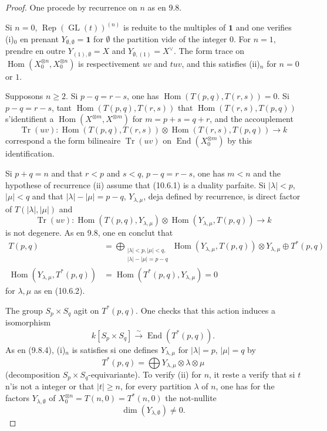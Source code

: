 \documentclass[11pt,a4paper]{article}
\theoremstyle{plain}
\theoremstyle{definition}
\DeclareMathOperator{\Hom}{Hom}
\DeclareMathOperator{\End}{End}
\DeclareMathOperator{\Tr}{Tr}
\DeclareMathOperator{\Rep}{Rep}
\DeclareMathOperator{\GL}{GL}
\newcommand{\isom}{\xrightarrow{\sim}}
\begin{document}
\begin{proof}
One procede by recurrence on $n$ as en 9.8.

Si $n = 0$, $\Rep(\GL(t))^{(n)}$ is reduite to the multiples of $\mathbf{1}$ and one verifies (i)$_0$ en prenant $Y_{\emptyset, \emptyset} = \mathbf{1}$ for $\emptyset$ the partition vide of the integer $0$. For $n = 1$, prendre en outre $Y_{(1), \emptyset} = X$ and $Y_{\emptyset, (1)} = X^\vee$. The form trace on $\Hom(X_0^{\otimes n}, X_0^{\otimes n})$ is respectivement $uv$ and $tuv$, and this satisfies (ii)$_n$ for $n = 0$ or $1$.

Supposons $n \geq 2$. Si $p - q = r - s$, one has $\Hom(T(p, q), T(r, s)) = 0$. Si $p - q = r - s$, tant $\Hom(T(p, q), T(r, s))$ that $\Hom(T(r, s), T(p, q))$ s'identifient a $\Hom(X^{\otimes m}, X^{\otimes m})$ for $m = p + s = q + r$, and the accouplement
\begin{equation}
\Tr(uv) : \Hom(T(p, q), T(r, s)) \otimes \Hom(T(r, s), T(p, q)) \to k \tag{10.6.1}
\end{equation}
correspond a the form bilineaire $\Tr(uv)$ on $\End(X_0^{\otimes m})$ by this identification.

Si $p + q = n$ and that $r < p$ and $s < q$, $p - q = r - s$, one has $m < n$ and the hypothese of recurrence (ii) assume that (10.6.1) is a duality parfaite. Si $|\lambda| < p$, $|\mu| < q$ and that $|\lambda| - |\mu| = p - q$, $Y_{\lambda, \mu}$, deja defined by recurrence, is direct factor of $T(|\lambda|, |\mu|)$ and
\[
\Tr(uv) : \Hom(T(p, q), Y_{\lambda, \mu}) \otimes \Hom(Y_{\lambda, \mu}, T(p, q)) \to k
\]
is not degenere. As en 9.8, one en conclut that
\begin{align}
T(p, q) &= \bigoplus_{\substack{|\lambda| < p, |\mu| < q, \\ |\lambda| - |\mu| = p - q}} \Hom(Y_{\lambda, \mu}, T(p, q)) \otimes Y_{\lambda, \mu} \oplus T^*(p, q) \tag{10.6.2} \\
\Hom(Y_{\lambda, \mu}, T^*(p, q)) &= \Hom(T^*(p, q), Y_{\lambda, \mu}) = 0 \tag{10.6.3}
\end{align}
for $\lambda, \mu$ as en (10.6.2).

The group $S_p \times S_q$ agit on $T^*(p, q)$. One checks that this action induces a isomorphism
\[
k[S_p \times S_q] \isom \End(T^*(p, q)).
\]
As en (9.8.4), (i)$_n$ is satisfies si one defines $Y_{\lambda, \mu}$ for $|\lambda| = p$, $|\mu| = q$ by
\begin{equation}
T^*(p, q) = \bigoplus Y_{\lambda, \mu} \otimes \lambda \otimes \mu \tag{10.6.4}
\end{equation}
(decomposition $S_p \times S_q$-equivariante). To verify (ii) for $n$, it reste a verify that si $t$ n'is not a integer or that $|t| \geq n$, for every partition $\lambda$ of $n$, one has for the factors $Y_{\lambda, \emptyset}$ of $X_0^{\otimes n} = T(n, 0) = T^*(n, 0)$ the not-nullite
\begin{equation}
\dim(Y_{\lambda, \emptyset}) \neq 0. \tag{10.6.5}
\end{equation}


\end{proof}
\end{document}
